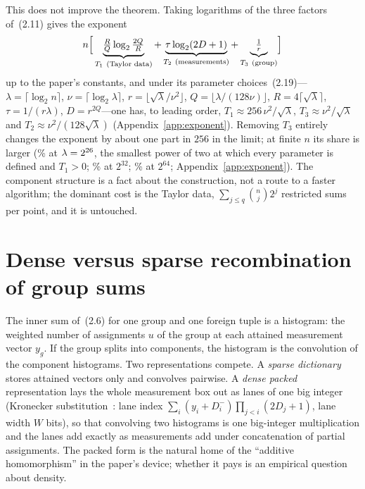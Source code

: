 \documentclass[11pt]{article}
\theoremstyle{definition}
\theoremstyle{remark}
\begin{document}
This does not improve the theorem. Taking logarithms of the three factors of~(2.11) gives the exponent
\[
n \Bigl[\, \underbrace{\tfrac{R}{Q} \log_2 \tfrac{2Q}{R}}_{T_1\ (\text{Taylor data})} + \underbrace{\tau \log_2(2D+1)}_{T_2\ (\text{measurements})} + \underbrace{\tfrac{1}{r}}_{T_3\ (\text{group})} \Bigr]
\]
up to the paper's constants, and under its parameter choices~(2.19)---$\lambda = \lceil \log_2 n \rceil$, $\nu = \lceil \log_2 \lambda \rceil$, $r = \lfloor \sqrt{\lambda}/\nu^2 \rfloor$, $Q = \lfloor \lambda/(128 \nu) \rfloor$, $R = 4 \lceil \sqrt{\lambda} \rceil$, $\tau = 1/(r\lambda)$, $D = r^{2Q}$---one has, to leading order, $T_1 \approx 256\, \nu^2/\sqrt{\lambda}$, $T_3 \approx \nu^2/\sqrt{\lambda}$ and $T_2 \approx \nu^2/(128 \sqrt{\lambda})$ (Appendix~\ref{app:exponent}). Removing $T_3$ entirely changes the exponent by about one part in $256$ in the limit; at finite $n$ its share is larger (\expShareA\% at $\lambda = 2^{26}$, the smallest power of two at which every parameter is defined and $T_1 > 0$; \expShareB\% at $2^{32}$; \expShareC\% at $2^{64}$; Appendix~\ref{app:exponent}). The component structure is a fact about the construction, not a route to a faster algorithm; the dominant cost is the Taylor data, $\sum_{j \le q} \binom{n}{j} 2^j$ restricted sums per point, and it is untouched.

\section{Dense versus sparse recombination of group sums}\label{sec:fibre}

The inner sum of~(2.6) for one group and one foreign tuple is a histogram: the weighted number of assignments $u$ of the group at each attained measurement vector $y_g$. If the group splits into components, the histogram is the convolution of the component histograms. Two representations compete. A \emph{sparse dictionary} stores attained vectors only and convolves pairwise. A \emph{dense packed} representation lays the whole measurement box out as lanes of one big integer (Kronecker substitution~\citep{Har09}: lane index $\sum_i (y_i + D_i^-) \prod_{j < i} (2D_j + 1)$, lane width $W$ bits), so that convolving two histograms is one big-integer multiplication and the lanes add exactly as measurements add under concatenation of partial assignments. The packed form is the natural home of the ``additive homomorphism'' in the paper's device; whether it pays is an empirical question about density.
\end{document}
